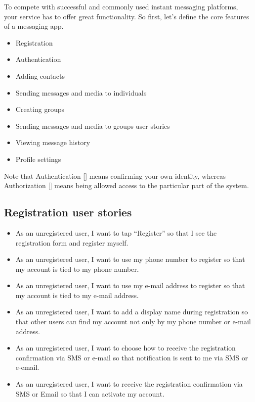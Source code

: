 To compete with successful and commonly used instant messaging platforms, your service has to offer great functionality.
So first, let’s define the core features of a messaging app.
\begin{itemize}
    \item Registration
    \item Authentication
    \item Adding contacts
    \item Sending messages and media to individuals
    \item Creating groups
    \item Sending messages and media to groups user stories
    \item Viewing message history
    \item Profile settings
\end{itemize}
Note that Authentication [\cite{burrows1989logic}] means confirming your own identity,
whereas Authorization [\cite{fagin1978authorization}] means being allowed access to the particular part of the system.

\subsection{Registration user stories}\label{subsec:registration}
\begin{itemize}
    \item As an unregistered user, I want to tap “Register” so that I see the registration form and register myself.
    \item As an unregistered user, I want to use my phone number to register so that my account is tied to my phone number.
    \item As an unregistered user, I want to use my e-mail address to register so that my account is tied to my e-mail address.
    \item As an unregistered user, I want to add a display name during registration so that other users can find my account not only by my phone number or e-mail address.
    \item As an unregistered user, I want to choose how to receive the registration confirmation via SMS or e-mail so that notification is sent to me via SMS or e-email.
    \item As an unregistered user, I want to receive the registration confirmation via SMS or Email so that I can activate my account.
\end{itemize}

